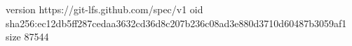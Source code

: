 version https://git-lfs.github.com/spec/v1
oid sha256:ec12db5ff287cedaa3632cd36d8c207b236c08ad3e880d3710d60487b3059af1
size 87544
